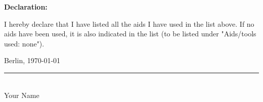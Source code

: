 \vspace{2cm}

\textbf{Declaration:}

I hereby declare that I have listed all the aids I have used in the list above. If no aids have been used, it is also indicated in the list (to be listed under "Aids/tools used: none").

\vspace{3cm}

\noindent Berlin, \today

\vspace{2cm}

\noindent\rule{6cm}{0.5pt}\\
Your Name

\cleardoublepage
